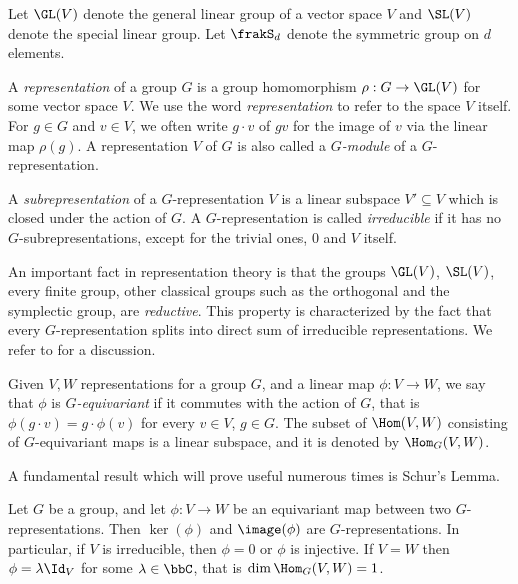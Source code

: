 Let $\GL(V)$ denote the general linear group of a vector space $V$ and $\SL(V)$ denote the special linear group. Let $\frakS_d$ denote the symmetric group on $d$ elements. 

\begin{definition}
\label{introduction-definition-grouprepresentation} 
A {\it representation} of a group $G$ is a group homomorphism $\rho : G \to \GL(V)$ for some vector space $V$. We use the word \emph{representation} to refer to the space $V$ itself. For $g \in G$ and $v \in V$, we often write $g \cdot v$ of $gv$ for the image of $v$ via the linear map $\rho(g)$. A representation $V$ of $G$ is also called a {\it $G$-module} of a $G$-representation.

A {\it subrepresentation} of a $G$-representation $V$ is a linear subspace $V' \subseteq V$ which is closed under the action of $G$. A $G$-representation is called {\it irreducible} if it has no $G$-subrepresentations, except for the trivial ones, $0$ and $V$ itself.
\end{definition}

An important fact in representation theory is that the groups $\GL(V)$, $\SL(V)$, every finite group, other classical groups such as the orthogonal and the symplectic group, are {\it reductive}. This property is characterized by the fact that every $G$-representation splits into direct sum of irreducible representations. We refer to \cite[Ch.9]{FH91} for a discussion. 

\begin{definition}
 \label{introduction-definition-equivariantmap}
Given $V,W$ representations for a group $G$, and a linear map $\phi : V \to W$, we say that $\phi$ is {\it $G$-equivariant} if it commutes with the action of $G$, that is $\phi( g \cdot v) = g \cdot \phi(v)$ for every $v \in V$, $g \in G$. The subset of $\Hom(V,W)$ consisting of $G$-equivariant maps is a linear subspace, and it is denoted by $\Hom_G(V,W)$. 
\end{definition}

A fundamental result which will prove useful numerous times is Schur's Lemma. 
\begin{lemma}
\label{introduction-lemma-Schur}
Let $G$ be a group, and let $\phi : V \to W$ be an equivariant map between two $G$-representations. Then $\ker(\phi)$ and $\image(\phi)$ are $G$-representations. In particular, if $V$ is irreducible, then $\phi = 0$ or $\phi$ is injective. If $V= W$ then $\phi = \lambda \Id_V$ for some $\lambda \in \bbC$, that is $\dim \Hom _G(V,W) = 1$.
\end{lemma}

